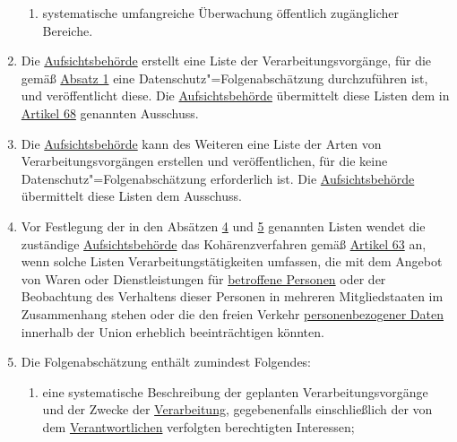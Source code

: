 \begin{enumerate}
\begin{enumerate}
    \item systematische umfangreiche Überwachung öffentlich zugänglicher Bereiche.%
    \label{itm:35-3c}

  \end{enumerate}

  \item Die \hyperref[itm:04-21]{Aufsichtsbehörde} erstellt eine Liste der Verarbeitungsvorgänge, für die gemäß \hyperref[itm:35-1]{Absatz 1} eine
   Datenschutz"=Folgenabschätzung durchzuführen ist, und veröffentlicht diese. Die \hyperref[itm:04-21]
   {Aufsichtsbehörde} übermittelt diese Listen dem in \hyperref[ch:68]{Artikel 68} genannten Ausschuss.
  \label{itm:35-4}

  \item Die \hyperref[itm:04-21]{Aufsichtsbehörde} kann des Weiteren eine Liste der Arten von Verarbeitungsvorgängen
   erstellen und veröffentlichen, für die keine Datenschutz"=Folgenabschätzung erforderlich ist. Die \hyperref
   [itm:04-21]{Aufsichtsbehörde} übermittelt diese Listen dem Ausschuss.%
  \label{itm:35-5}

  \item Vor Festlegung der in den Absätzen \hyperref[itm:35-4]{4} und \hyperref[itm:35-5]{5} genannten Listen wendet die
   zuständige \hyperref[itm:04-21]{Aufsichtsbehörde} das Kohärenzverfahren gemäß \hyperref[ch:63]{Artikel 63} an, wenn
   solche Listen Verarbeitungstätigkeiten umfassen, die mit dem Angebot von Waren oder Dienstleistungen für \hyperref
   [itm:04-1]{betroffene Personen} oder der Beobachtung des Verhaltens dieser Personen in mehreren Mitgliedstaaten im
   Zusammenhang stehen oder die den freien Verkehr \hyperref[itm:04-1]{personenbezogener Daten} innerhalb der Union
   erheblich beeinträchtigen könnten.%
  \label{itm:35-6}

  \item Die Folgenabschätzung enthält zumindest Folgendes:%
  \label{itm:35-7}

  \begin{enumerate}
  
    \item eine systematische Beschreibung der geplanten Verarbeitungsvorgänge und der Zwecke der \hyperref[itm:04-2]
     {Verarbeitung}, gegebenenfalls einschließlich der von dem \hyperref[itm:04-7]{Verantwortlichen} verfolgten
     berechtigten Interessen;%
    \label{itm:35-7a}


\end{enumerate}
\end{enumerate}
